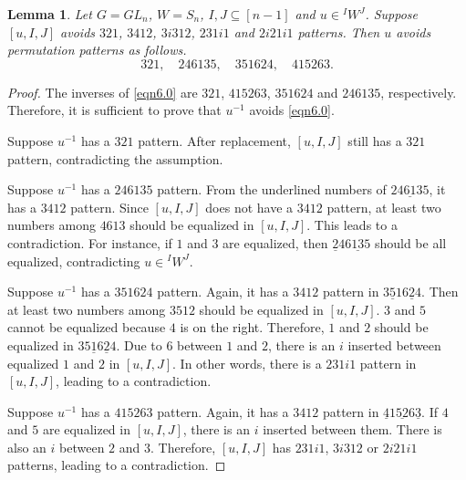 \documentclass[12pt]{amsart}
\newtheorem{lemma}[theorem]{Lemma}
\theoremstyle{definition}
\theoremstyle{remark}
\begin{document}
\begin{lemma}\label{lem6.0}
Let $G = GL_n$, $W= S_n$, $I,J \subseteq [n-1]$ and $u \in {}^I W^J$. Suppose $[u,I,J]$ avoids $321$, $3412$, $3i312$, $231i1$ and $2i21i1$ patterns. Then $u$ avoids permutation patterns as follows.
\begin{equation}\label{eqn6.0}
321, \quad 246135, \quad 351624, \quad 415263.
\end{equation}
\end{lemma}
\begin{proof}
The inverses of \eqref{eqn6.0} are $321$, $415263$, $351624$ and $246135$, respectively. Therefore, it is sufficient to prove that $u^{-1}$ avoids \eqref{eqn6.0}.

Suppose $u^{-1}$ has a $321$ pattern. After replacement, $[u,I,J]$ still has a $321$ pattern, contradicting the assumption.

Suppose $u^{-1}$ has a $246135$ pattern. From the underlined numbers of $2\underline{4613}5$, it has a $3412$ pattern. Since $[u,I,J]$ does not have a $3412$ pattern, at least two numbers among $4613$ should be equalized in $[u,I,J]$. This leads to a contradiction. For instance, if $1$ and $3$ are equalized, then $\underline{2}46\underline{13}5$ should be all equalized, contradicting $u \in {}^I W^J$. 

Suppose $u^{-1}$ has a $351624$ pattern. Again, it has a $3412$ pattern in $\underline{351}6\underline{2}4$. Then at least two numbers among $3512$ should be equalized in $[u,I,J]$. $3$ and $5$ cannot be equalized because $4$ is on the right. Therefore, $1$ and $2$ should be equalized in $35\underline{1}6 \underline{2}4$. Due to $6$ between $1$ and $2$, there is an $i$ inserted between equalized $1$ and $2$ in $[u,I,J]$. In other words, there is a $231i1$ pattern in $[u,I,J]$, leading to a contradiction.

Suppose $u^{-1}$ has a $415263$ pattern. Again, it has a $3412$ pattern in $\underline{4}1\underline{52}6\underline{3}$. If $4$ and $5$ are equalized in $[u,I,J]$, there is an $i$ inserted between them. There is also an $i$ between $2$ and $3$. Therefore, $[u,I,J]$ has $231i1$, $3i312$ or $2i21i1$ patterns, leading to a contradiction.
\end{proof}
\end{document}
